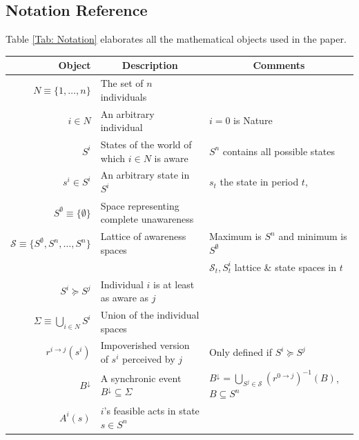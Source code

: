 \documentclass[
11pt,
titlepage,
reqno,
]{article}%
\theoremstyle{definition}
\begin{document}
\subsection{Notation Reference}
Table \ref{Tab: Notation} elaborates all the mathematical objects used in the paper.
\begin{table}\centering
{}
\begin{tabular}{@{}rll@{}}\toprule
Object                                             & \multicolumn{1}{c}{Description}                       & \multicolumn{1}{c}{Comments}\\ \midrule
$N\equiv \{1,\dots,n\}$                            & The set of $n$ individuals                            & \\
$i\in N$                                           & An arbitrary individual                               & $i=0$ is Nature\\
$S^i$                                              & States of the world of which $i\in N$ is aware        & $S^n$ contains all possible states\\
$s^i\in S^i$                                       & An arbitrary state in $S^i$                           & $s_t$ the state in period $t$,\\
$S^\emptyset\equiv\{\emptyset\}$                   & Space representing complete unawareness               & \\
$\mathcal{S}\equiv \{S^\emptyset,S^n,\ldots,S^n\}$ & Lattice of awareness spaces                           & Maximum is $S^n$ and minimum is $S^\emptyset$\\
												   &													   & $\mathcal{S}_t,S^i_t$ lattice \& state spaces in $t$\\
$S^i\succeq S^j$                                   & Individual $i$ is at least as aware as $j$            & \\
$\Sigma\equiv\bigcup_{i\in N}S^i$                  & Union of the individual spaces                        & \\
$r^{i\rightarrow j}(s^i)$                          & Impoverished version of $s^i$ perceived by $j$        & Only defined if  $S^i\succeq S^j$\\
$B^{\downarrow}$                                   & A synchronic event $B^{\downarrow}\subseteq \Sigma$   & $B^{\downarrow}=\bigcup_{S^j\in \mathcal{S}}\left(r^{0\rightarrow j}\right)^{-1}(B)$, $B\subseteq S^n$\\
$A^i(s)$                                           & $i$'s feasible acts in state $s\in S^n$               & \\

\end{tabular}
\end{table}
\end{document}
